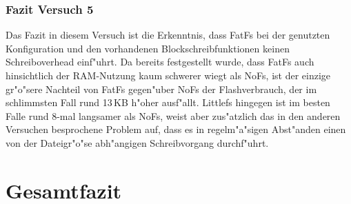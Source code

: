 \documentclass[11pt]{article}
\begin{document}
\subsubsection*{Fazit Versuch 5}
Das Fazit in diesem Versuch ist die Erkenntnis, dass FatFs bei der genutzten Konfiguration und
den vorhandenen Blockschreibfunktionen keinen Schreiboverhead einf"uhrt. Da bereits festgestellt wurde,
dass FatFs auch hinsichtlich der RAM-Nutzung kaum schwerer wiegt als NoFs, ist der einzige gr"o"sere Nachteil
von FatFs gegen"uber NoFs der Flashverbrauch, der im schlimmsten Fall rund 13\,KB h"oher ausf"allt. 
Littlefs hingegen ist im besten Falle rund 8-mal langsamer als NoFs, weist aber zus"atzlich das
in den anderen Versuchen besprochene Problem auf, dass es in regelm"a"sigen Abst"anden einen von
der Dateigr"o"se abh"angigen Schreibvorgang durchf"uhrt.  

\section{Gesamtfazit}
\end{document}
